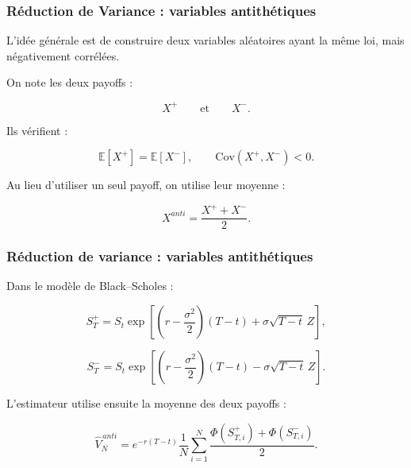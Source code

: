 \documentclass[aspectratio=169,11pt]{beamer}
\begin{document}
\begin{frame}
    \frametitle{Réduction de Variance : variables antithétiques}

    L'idée générale est de construire deux variables aléatoires
    ayant la même loi, mais négativement corrélées.

    \vspace{0.3cm}

    On note les deux payoffs :

    \[
        X^+
        \qquad\text{et}\qquad
        X^-.
    \]

    Ils vérifient :

    \[
        \mathbb{E}[X^+]
        =
        \mathbb{E}[X^-],
        \qquad
        \mathrm{Cov}(X^+,X^-)<0.
    \]

    \vspace{0.3cm}

    Au lieu d'utiliser un seul payoff, on utilise leur moyenne :

    \[
        \boxed{
        X^{anti}
        =
        \frac{X^+ + X^-}{2}.
        }
    \]

    \vspace{0.25cm}

\end{frame}






\begin{frame}
    \frametitle{Réduction de variance : variables antithétiques}


    Dans le modèle de Black--Scholes :

    \[
        S_T^{+}
        =
        S_t
        \exp\left[
            \left(r-\frac{\sigma^2}{2}\right)(T-t)
            +
            \sigma\sqrt{T-t}\,Z
        \right],
    \]

    \[
        S_T^{-}
        =
        S_t
        \exp\left[
            \left(r-\frac{\sigma^2}{2}\right)(T-t)
            -
            \sigma\sqrt{T-t}\,Z
        \right].
    \]

    \vspace{0.25cm}

    L'estimateur utilise ensuite la moyenne des deux payoffs :

    \[
        \boxed{
        \widehat{V}_N^{\,anti}
        =
        e^{-r(T-t)}
        \frac{1}{N}
        \sum_{i=1}^{N}
        \frac{
            \Phi(S_{T,i}^{+})
            +
            \Phi(S_{T,i}^{-})
        }{2}.
        }
    \]


\end{frame}
\end{document}
